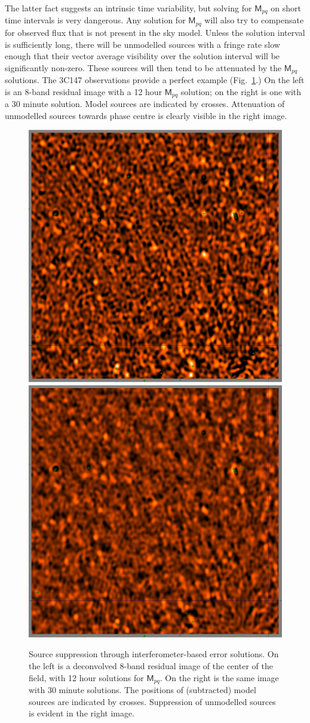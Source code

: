\documentclass[]{aa}
\newcommand{\coh}[2]{\mathsf{{#1}}_{{#2}}}
\begin{document}
The latter fact suggests an intrinsic time variability, but solving for $\coh{M}{pq}$ on short time intervals is very dangerous. Any solution for $\coh{M}{pq}$ will also try to compensate for observed flux that is not present in the sky model. Unless the solution interval is sufficiently long, there will be unmodelled sources with a fringe rate slow enough that their vector average visibility over the solution interval will be significantly non-zero. These sources will then tend to be attenuated by the $\coh{M}{pq}$ solutions. The 3C147 observations provide a perfect example (Fig.~\ref{fig:source-suppression}.) On the left is an 8-band residual image with a 12 hour $\coh{M}{pq}$ solution; on the right is one with a 30 minute solution. Model sources are indicated by crosses. Attenuation of unmodelled sources towards phase centre is clearly visible in the right image. 

\begin{figure}
\begin{centering}
\includegraphics[width=.5\columnwidth]{IG_12h}%
\includegraphics[width=.5\columnwidth]{IG_30m}\par
\end{centering}
\caption{\label{fig:source-suppression}Source suppression through interferometer-based error solutions. On the left is a deconvolved 8-band residual image of the center of the field, with 12 hour solutions for $\coh{M}{pq}$. On the right is the same image with 30 minute solutions. The positions of (subtracted) model sources are indicated by crosses. Suppression of unmodelled sources is evident in the right image.
}
\end{figure}
\end{document}
